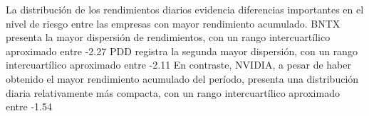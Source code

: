 La distribución de los rendimientos diarios evidencia diferencias importantes en el nivel de riesgo entre las empresas con mayor rendimiento acumulado. BNTX presenta la mayor dispersión de rendimientos, con un rango intercuartílico aproximado entre -2.27%
PDD registra la segunda mayor dispersión, con un rango intercuartílico aproximado entre -2.11%
En contraste, NVIDIA, a pesar de haber obtenido el mayor rendimiento acumulado del período, presenta una distribución diaria relativamente más compacta, con un rango intercuartílico aproximado entre -1.54%